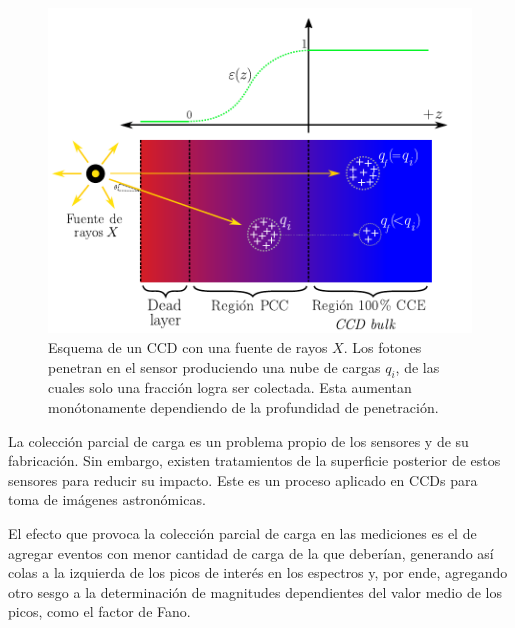 \begin{figure}%
    \centering
        \includegraphics[scale=.8]{Figs/PCC.pdf}
    \caption{\footnotesize{Esquema de un CCD con una fuente de rayos $X$. Los fotones penetran en el sensor produciendo una nube de cargas $q_{i}$, de las cuales solo una fracción logra ser colectada. Esta aumentan monótonamente dependiendo de la profundidad de penetración.}}
    \label{fig:PCC}
\end{figure}
La colección parcial de carga es un problema propio de los sensores y de su fabricación. Sin embargo, existen tratamientos de la superficie posterior de estos sensores para reducir su impacto. Este es un proceso aplicado en CCDs para toma de imágenes astronómicas. 

El efecto que provoca la colección parcial de carga en las mediciones es el de agregar eventos con menor cantidad de carga de la que deberían, generando así colas a la izquierda de los picos de interés en los espectros y, por ende, agregando otro sesgo a la determinación de magnitudes dependientes del valor medio de los picos, como el factor de Fano.




